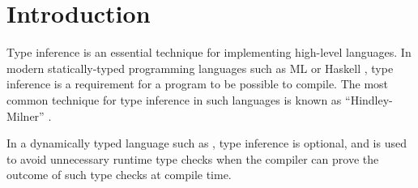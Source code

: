\section{Introduction}

Type inference is an essential technique for implementing high-level
languages.  In modern statically-typed programming languages such as
ML \cite{Milner:1997:DSM:549659} or Haskell
\cite{Hudak:2007:HHL:1238844.1238856}, type inference is a requirement
for a program to be possible to compile.  The most common technique
for type inference in such languages is known as ``Hindley-Milner''
\cite{Damas:1982:PTF:582153.582176}.

In a dynamically typed language such as \commonlisp{}
\cite{ansi:common:lisp}, type inference is optional, and is used to
avoid unnecessary runtime type checks when the compiler can prove the
outcome of such type checks at compile time.
